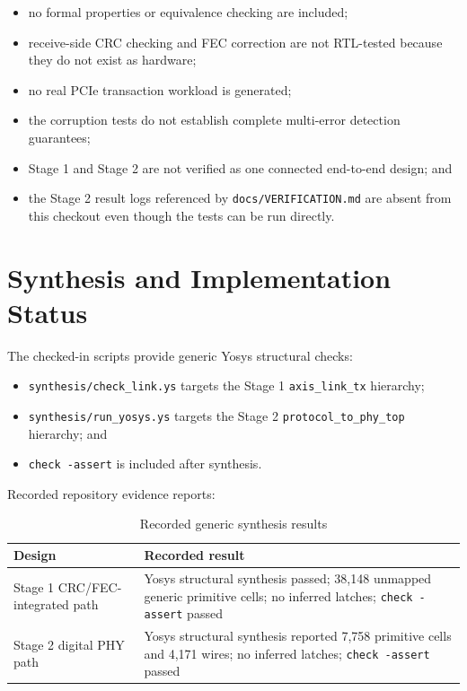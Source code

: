 \documentclass[11pt,a4paper]{article}
\newcommand{\code}[1]{\texttt{#1}}
\begin{document}
\begin{itemize}[leftmargin=*]
    \item no formal properties or equivalence checking are included;
    \item receive-side CRC checking and FEC correction are not RTL-tested because they do not exist as hardware;
    \item no real PCIe transaction workload is generated;
    \item the corruption tests do not establish complete multi-error detection guarantees;
    \item Stage 1 and Stage 2 are not verified as one connected end-to-end design; and
    \item the Stage 2 result logs referenced by \code{docs/VERIFICATION.md} are absent from this checkout even though the tests can be run directly.
\end{itemize}

\section{Synthesis and Implementation Status}

The checked-in scripts provide generic Yosys structural checks:

\begin{itemize}[leftmargin=*]
    \item \code{synthesis/check\_link.ys} targets the Stage 1 \code{axis\_link\_tx} hierarchy;
    \item \code{synthesis/run\_yosys.ys} targets the Stage 2 \code{protocol\_to\_phy\_top} hierarchy; and
    \item \code{check -assert} is included after synthesis.
\end{itemize}

Recorded repository evidence reports:

\begin{table}[H]
\centering
\caption{Recorded generic synthesis results}
\begin{tabular}{>{\raggedright\arraybackslash}p{} p{}}
\toprule
\textbf{Design} & \textbf{Recorded result} \\
\midrule
Stage 1 CRC/FEC-integrated path & Yosys structural synthesis passed; 38,148 unmapped generic primitive cells; no inferred latches; \code{check -assert} passed \\
Stage 2 digital PHY path & Yosys structural synthesis reported 7,758 primitive cells and 4,171 wires; no inferred latches; \code{check -assert} passed \\
\bottomrule
\end{tabular}
\end{table}
\end{document}
